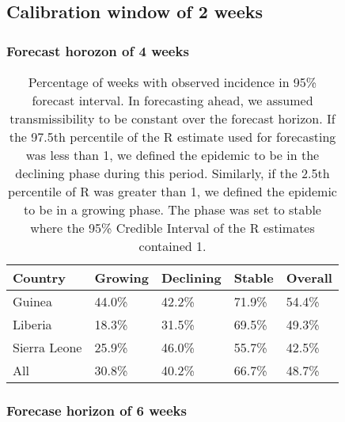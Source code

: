 \documentclass[9pt,twoside,lineno]{pnas-new}
\begin{document}
\subsection{Calibration window of 2 weeks}\label{sec:pm2}
\subsubsection{Forecast horozon of 4 weeks}\label{sec:pm24}

\begin{table}
  \centering
  \caption{Percentage of weeks with observed incidence in 95\% forecast
    interval. In forecasting ahead, we assumed transmissibility to be
    constant over the forecast horizon. If the 97.5th percentile of the R
    estimate used for forecasting was less than 1, we defined the epidemic
    to be in the declining phase during this period. Similarly, if the 2.5th
    percentile of R was greater than 1, we defined the epidemic to be in a
    growing phase. The phase was set to stable where the 95\% Credible
    Interval of the R estimates contained 1.}
  \label{tab:propinci}
  \begin{tabular}{lllll}
    \toprule
    Country  & Growing & Declining & Stable & Overall \\
    \midrule
    Guinea  & 44.0\% & 42.2\% & 71.9\% & 54.4\% \\
    Liberia & 18.3\% & 31.5\% & 69.5\% & 49.3\% \\
    Sierra Leone & 25.9\% & 46.0\% & 55.7\% & 42.5\% \\
    All & 30.8\% & 40.2\% & 66.7\% & 48.7\% \\
    \bottomrule
  \end{tabular}
\end{table}\FloatBarrier

\subsubsection{Forecase horizon of 6 weeks}\label{sec:pm26} 
\end{document}
